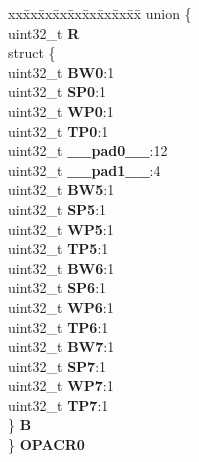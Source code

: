 \begin{DoxyCompactItemize}
\begin{tabbing}
\end{tabbing}\item 
\mbox{\label{structPBRIDGE__B__tag_afb70eced7737d8eb859068c1d06241d0}} 
\begin{tabbing}
xx\=xx\=xx\=xx\=xx\=xx\=xx\=xx\=xx\=\kill
union \{\\
\>uint32\_t {\bfseries R}\\
\>struct \{\\
\>\>uint32\_t {\bfseries BW0}:1\\
\>\>uint32\_t {\bfseries SP0}:1\\
\>\>uint32\_t {\bfseries WP0}:1\\
\>\>uint32\_t {\bfseries TP0}:1\\
\>\>uint32\_t {\bfseries \_\_pad0\_\_}:12\\
\>\>uint32\_t {\bfseries \_\_pad1\_\_}:4\\
\>\>uint32\_t {\bfseries BW5}:1\\
\>\>uint32\_t {\bfseries SP5}:1\\
\>\>uint32\_t {\bfseries WP5}:1\\
\>\>uint32\_t {\bfseries TP5}:1\\
\>\>uint32\_t {\bfseries BW6}:1\\
\>\>uint32\_t {\bfseries SP6}:1\\
\>\>uint32\_t {\bfseries WP6}:1\\
\>\>uint32\_t {\bfseries TP6}:1\\
\>\>uint32\_t {\bfseries BW7}:1\\
\>\>uint32\_t {\bfseries SP7}:1\\
\>\>uint32\_t {\bfseries WP7}:1\\
\>\>uint32\_t {\bfseries TP7}:1\\
\>\} {\bfseries B}\\
\} {\bfseries OPACR0}\\


\end{tabbing}
\end{DoxyCompactItemize}
